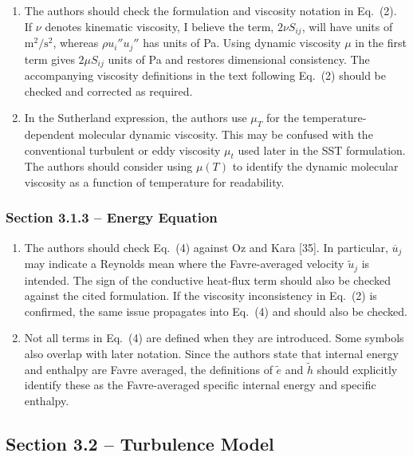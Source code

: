 \documentclass[11pt]{article}
\begin{document}
	\begin{enumerate}
		\item The authors should check the formulation and viscosity notation in Eq.~(2). If $\nu$ denotes kinematic viscosity, I believe the term,  $2\nu S_{ij}$, will have units of $\mathrm{m^2/s^2}$, whereas $\rho u_i''u_j''$ has units of Pa. Using dynamic viscosity $\mu$ in the first term gives $2\mu S_{ij}$ units of Pa and restores dimensional consistency. The accompanying viscosity definitions in the text following Eq.~(2) should be checked and corrected as required.
		
		\item In the Sutherland expression, the authors use $\mu_T$ for the temperature-dependent molecular dynamic viscosity. This may be confused with the conventional turbulent or eddy viscosity $\mu_t$ used later in the SST formulation. The authors should consider using $\mu(T)$ to identify the dynamic molecular viscosity as a function of temperature for readability.
	\end{enumerate}
	
	
	\subsubsection*{Section 3.1.3 -- Energy Equation}
	
	\begin{enumerate}
		\item The authors should check Eq.~(4) against Oz and Kara [35]. In particular, $\overline{u}_j$ may indicate a Reynolds mean where the Favre-averaged velocity $\widetilde{u}_j$ is intended. The sign of the conductive heat-flux term should also be checked against the cited formulation. If the viscosity inconsistency in Eq.~(2) is confirmed, the same issue propagates into Eq.~(4) and should also be checked.
		
		\item Not all terms in Eq.~(4) are defined when they are introduced. Some symbols also overlap with later notation. Since the authors state that internal energy and enthalpy are Favre averaged, the definitions of $\widetilde{e}$ and $\widetilde{h}$ should explicitly identify these as the Favre-averaged specific internal energy and specific enthalpy.
	\end{enumerate}
	
	
	\subsection*{Section 3.2 -- Turbulence Model}
	
\end{document}
